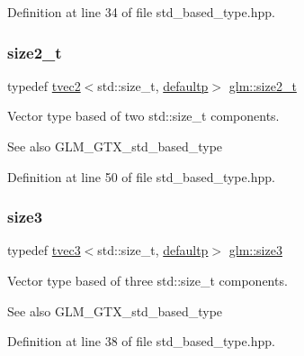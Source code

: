 Definition at line 34 of file std\+\_\+based\+\_\+type.\+hpp.

\mbox{\label{group__gtx__std__based__type_ga47b1e2bca519b02eb8500a240216b5de}} 
\subsubsection{\texorpdfstring{size2\_t}{size2\_t}}
{\footnotesize\ttfamily typedef \mbox{\hyperlink{structglm_1_1tvec2}{tvec2}}$<$std\+::size\+\_\+t, \mbox{\hyperlink{namespaceglm_a0f04f086094c747d227af4425893f545a9d21ccd8b5a009ec7eb7677befc3bf51}{defaultp}}$>$ \mbox{\hyperlink{group__gtx__std__based__type_ga47b1e2bca519b02eb8500a240216b5de}{glm\+::size2\+\_\+t}}}

Vector type based of two std\+::size\+\_\+t components. \begin{DoxySeeAlso}{See also}
G\+L\+M\+\_\+\+G\+T\+X\+\_\+std\+\_\+based\+\_\+type 
\end{DoxySeeAlso}


Definition at line 50 of file std\+\_\+based\+\_\+type.\+hpp.

\mbox{\label{group__gtx__std__based__type_gacf3e47fc09ad812f100e13442919fc79}} 
\subsubsection{\texorpdfstring{size3}{size3}}
{\footnotesize\ttfamily typedef \mbox{\hyperlink{structglm_1_1tvec3}{tvec3}}$<$std\+::size\+\_\+t, \mbox{\hyperlink{namespaceglm_a0f04f086094c747d227af4425893f545a9d21ccd8b5a009ec7eb7677befc3bf51}{defaultp}}$>$ \mbox{\hyperlink{group__gtx__std__based__type_gacf3e47fc09ad812f100e13442919fc79}{glm\+::size3}}}

Vector type based of three std\+::size\+\_\+t components. \begin{DoxySeeAlso}{See also}
G\+L\+M\+\_\+\+G\+T\+X\+\_\+std\+\_\+based\+\_\+type 
\end{DoxySeeAlso}


Definition at line 38 of file std\+\_\+based\+\_\+type.\+hpp.

